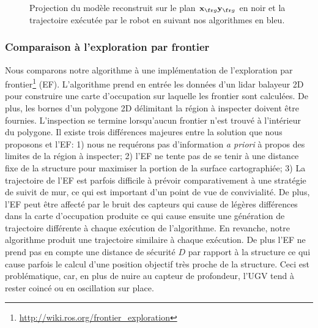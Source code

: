 \begin{figure}[p]
{  	\label{subfig:large gamma husky 4.5}
  }
  \hfil
  \caption{
  Projection du modèle reconstruit sur le plan $\vect{x}_{\fr g}\vect{y}_{\fr g}$ en noir et la trajectoire exécutée par le robot en suivant nos algorithmes en bleu.
  }
  \label{fig:relative size}
\end{figure}

\subsubsection{Comparaison à l'exploration par frontier}

Nous comparons notre algorithme à une implémentation de l'exploration par frontier\footnote{\url{http://wiki.ros.org/frontier_exploration}} (EF). L'algorithme prend en entrée les données d'un lidar balayeur 2D pour construire une carte d'occupation sur laquelle les frontier sont calculées. De plus, les bornes d'un polygone 2D délimitant la région à inspecter doivent être fournies. L'inspection se termine lorsqu’aucun frontier n'est trouvé à l'intérieur du polygone. Il existe trois différences majeures entre la solution que nous proposons et l'EF: 1) nous ne requérons pas d'information \textit{a priori} à propos des limites de la région à inspecter; 2) l'EF ne tente pas de se tenir à une distance fixe de la structure pour maximiser la portion de la surface cartographiée; 3) La trajectoire de l'EF est parfois difficile à prévoir comparativement à une stratégie de suivit de mur, ce qui est important d'un point de vue de convivialité. De plus, l'EF peut être affecté par le bruit des capteurs qui cause de légères différences dans la carte d'occupation produite ce qui cause ensuite une génération de trajectoire différente à chaque exécution de l'algorithme. En revanche, notre algorithme produit une trajectoire similaire à chaque exécution. De plus l'EF ne prend pas en compte une distance de sécurité $D$ par rapport à la structure ce qui cause parfois le calcul d'une position objectif très proche de la structure. Ceci est problématique, car, en plus de nuire au capteur de profondeur, l'UGV tend à rester coincé ou en oscillation sur place.

